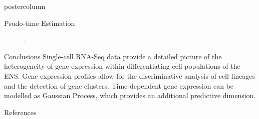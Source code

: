 \documentclass{beamer}
\begin{document}
\begin{frame}
\begin{columns}
\begin{column}{.45\textwidth}
\begin{beamercolorbox}[center]{postercolumn}
\begin{minipage}{.98\textwidth}
{\begin{myblock}{Psudo-time Estimation}
\begin{figure}
\begin{minipage}{\textwidth}
	\caption{.}
	\label{fig:pseudotime}
\end{minipage}
\end{figure}
\end{myblock}\vfill
\begin{myblock}{Conclusions}
Single-cell RNA-Seq data provide a detailed picture of the heterogeneity of
gene expression within differentiating cell populations of the ENS.
Gene expression profiles allow for the discriminative analysis of cell lineages
and the detection of gene clusters. Time-dependent gene expression can be modelled
as Gaussian Process, which provides an additional predictive dimension.
\end{myblock}\vfill
\begin{myblock}{References}
\footnotesize


\end{myblock}\vfill
}\end{minipage}
\end{beamercolorbox}
\end{column}
\end{columns}
\end{frame}
\end{document}
